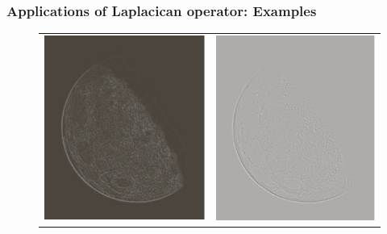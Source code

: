 \documentclass[english,11pt,table,handout]{beamer}
\begin{document}
{
	\frametitle{Applications of Laplacican operator: Examples}
	\begin{figure}[!h]
		\begin{tabular}{cc}
			\includegraphics[scale=0.5]{north_pole_laplacian_unscaled.png} &
			\includegraphics[scale=0.5]{north_pole_laplacian_scaled.png} \\

\end{tabular}
\end{figure}}
\end{document}
